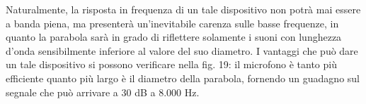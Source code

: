 Naturalmente, la risposta in frequenza di un tale dispositivo non potrà mai essere a banda piena, ma presenterà un’inevitabile carenza sulle basse frequenze, in quanto la parabola sarà in grado di
riflettere solamente i suoni con lunghezza d’onda sensibilmente inferiore al valore del suo diametro.
I vantaggi che può dare un tale dispositivo si possono verificare nella fig. 19: il microfono è tanto più efficiente quanto più largo è il diametro della parabola, fornendo un guadagno sul segnale che può arrivare a 30 dB a 8.000 Hz.

